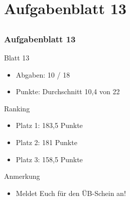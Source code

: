 \section[Rückblick]{Aufgabenblatt 13}
\subsection*{}
\begin{frame}
	\frametitle{Aufgabenblatt 13}
	\begin{block}{Blatt 13}
		\begin{itemize}
			\item Abgaben: 10 / 18
			\item Punkte: Durchschnitt 10,4 von 22
		\end{itemize}
   \end{block}
	\begin{block}{Ranking}
 		\begin{itemize}
 	  		\item Platz 1: 183,5 Punkte
 	  		\item Platz 2: 181 Punkte
			\item Platz 3: 158,5 Punkte
 	  \end{itemize}
	\end{block}
  \pause
	\begin{block}{Anmerkung}
  	\begin{itemize}
			\item Meldet Euch für den ÜB-Schein an!
		\end{itemize}
	\end{block}
\end{frame}
